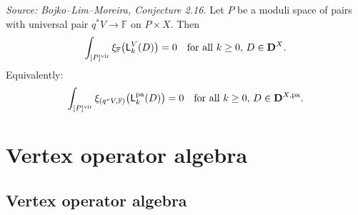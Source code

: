 
\begin{conjecture}[VirasoroConjecturePairs]
  \label{conj:virasoro-pairs}
  \textit{Source: Bojko--Lim--Moreira, Conjecture 2.16.}
  Let \(P\) be a moduli space of pairs with universal pair \(q^*V \to \mathbb{F}\)
  on \(P \times X\). Then
  \[\int_{[P]^{\mathrm{vir}}} \xi_\mathbb{F}\bigl(\mathsf{L}_k^V(D)\bigr) = 0
    \quad \text{for all } k \geq 0,\, D \in \mathbf{D}^X.\]
  Equivalently:
  \[\int_{[P]^{\mathrm{vir}}} \xi_{(q^*V, \mathbb{F})}\bigl(\mathsf{L}_k^{\mathrm{pa}}(D)\bigr) = 0
    \quad \text{for all } k \geq 0,\, D \in \mathbf{D}^{X,\mathrm{pa}}.\]
\end{conjecture}

\section{Vertex operator algebra}
\label{sec:voa-background}

\subsection{Vertex operator algebra}

